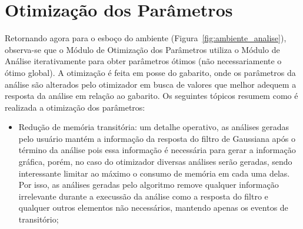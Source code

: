 \section{Otimização dos Parâmetros}
\label{sec:otimizacao}

Retornando agora para o esboço do ambiente
(Figura~\ref{fig:ambiente_analise}), observa-se que o Módulo de
Otimização dos Parâmetros utiliza o Módulo de Análise iterativamente
para obter parâmetros ótimos (não necessariamente o ótimo global).
A otimização é feita em posse do gabarito, onde os parâmetros da
análise são alterados pelo otimizador em busca de valores que melhor
adequem a resposta da análise em relação ao gabarito. Os seguintes
tópicos resumem como é realizada a otimização dos parâmetros:

\begin{itemize}

\item Redução de memória transitória: um detalhe operativo, as
análises geradas pelo usuário mantém a informação da resposta do
filtro de Gaussiana após o término da análise pois essa informação é
necessária para gerar a informação gráfica, porém, no caso do
otimizador diversas análises serão geradas, sendo interessante limitar
ao máximo o consumo de memória em cada uma delas. Por isso, as
análises geradas pelo algoritmo remove qualquer informação irrelevante
durante a execussão da análise como a resposta do filtro e qualquer
outros elementos não necessários, mantendo apenas os eventos de
transitório;


\end{itemize}
